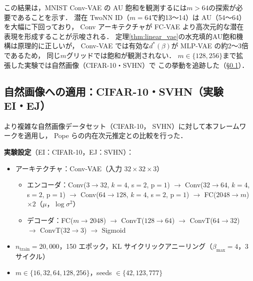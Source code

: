 \documentclass[11pt,a4paper]{jsarticle}
\begin{document}
この結果は，MNIST Conv-VAE の AU 飽和を観測するには$m > 64$の探索が必要であることを示す．
潜在 TwoNN ID（$m=64$で約13〜14）は AU（54〜64）を大幅に下回っており，
Conv アーキテクチャが FC-VAE より高次元的な潜在表現を形成することが示唆される．
定理\ref{thm:linear_vae}の水充填的AU飽和機構は原理的に正しいが，
Conv-VAE では有効な$d^*(\beta)$が MLP-VAE の約2〜3倍であるため，
同じ$m$グリッドでは飽和が観測されない．
$m \in \{128, 256\}$まで拡張した実験では自然画像（CIFAR-10・SVHN）で
この挙動を追跡した（§\ref{sec:exp_natural}）．

\subsection{自然画像への適用：CIFAR-10・SVHN（実験 EI・EJ）}\label{sec:exp_natural}

より複雑な自然画像データセット（CIFAR-10\cite{krizhevsky2009learning}，
SVHN\cite{netzer2011reading}）に対して本フレームワークを適用し，
Pope ら\cite{pope2021intrinsic}の内在次元推定との比較を行った．

\textbf{実験設定}（EI：CIFAR-10，EJ：SVHN）：
\begin{itemize}
  \item アーキテクチャ：Conv-VAE（入力 $32 \times 32 \times 3$）
        \begin{itemize}
          \item エンコーダ：Conv($3\to32$, $k=4$, s$=2$, p$=1$) $\to$ Conv($32\to64$, $k=4$, s$=2$, p$=1$) $\to$
                Conv($64\to128$, $k=4$, s$=2$, p$=1$) $\to$ FC($2048 \to m$) $\times 2$（$\mu$，$\log\sigma^2$）
          \item デコーダ：FC($m \to 2048$) $\to$ ConvT($128\to64$) $\to$ ConvT($64\to32$) $\to$ ConvT($32\to3$) $\to$ Sigmoid
        \end{itemize}
  \item $n_{\mathrm{train}} = 20{,}000$，150 エポック，KL サイクリックアニーリング（$\beta_{\max}=4$，3サイクル）
  \item $m \in \{16, 32, 64, 128, 256\}$，seeds $\in \{42, 123, 777\}$
\end{itemize}
\end{document}
